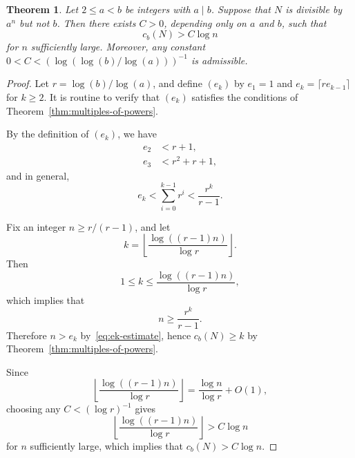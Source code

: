 \documentclass[10pt,a4paper]{amsart}
\newtheorem{theorem}{Theorem}
\begin{document}
\begin{theorem} \label{thm:multiples-powers-log-bound}
    Let $2 \le a < b$ be integers with $a \mid b$.
    Suppose that $N$ is divisible by $a^n$ but not $b$. Then
    there exists $C > 0$, depending only on $a$ and $b$, such that
    \[
        c_b(N) > C \log n
    \]
    for $n$ sufficiently large.
    Moreover, any constant $0 < C < (\log(\log(b)/\log(a)))^{-1}$ is admissible.
\end{theorem}

\begin{proof}
    Let $r = \log(b) / \log(a)$, and
    define $(e_k)$ by $e_1 = 1$ and $e_k = \lceil r e_{k-1} \rceil$
    for $k \ge 2$.
    It is routine to verify that $(e_k)$ satisfies the conditions of
    Theorem~\ref{thm:multiples-of-powers}.

    By the definition of $(e_k)$, we have
    \begin{align*}
        e_2 & < r + 1,             \\
        e_3 & < r^2 + r + 1,
    \end{align*}
    and in general,
    \begin{equation} \label{eq:ek-estimate}
        e_k < \sum_{i=0}^{k-1} r^{i}
        < \frac{r^k}{r - 1}.
    \end{equation}

    Fix an integer $n \ge r/(r-1)$, and let
    \[
        k = \left\lfloor \frac{\log((r-1)n)}{\log r} \right\rfloor.
    \]
    Then \[
        1 \le k \le \frac{\log((r-1) n)}{\log r},
    \]
    which implies that
    \[
        n \ge \frac{r^k}{r-1}.
    \]
    Therefore $n > e_k$ by~\eqref{eq:ek-estimate}, hence
    $c_b(N) \ge k$ by Theorem~\ref{thm:multiples-of-powers}.

    Since
    \[
        \left\lfloor \frac{\log((r-1)n)}{\log r} \right\rfloor
        = \frac{\log n}{\log r} + O(1),
    \]
    choosing any $C < (\log r)^{-1}$ gives
    \[
        \left\lfloor \frac{\log((r-1)n)}{\log r} \right\rfloor
        > C \log n
    \]
    for $n$ sufficiently large, which implies that $c_b(N) > C \log n$.
\end{proof}
\end{document}
